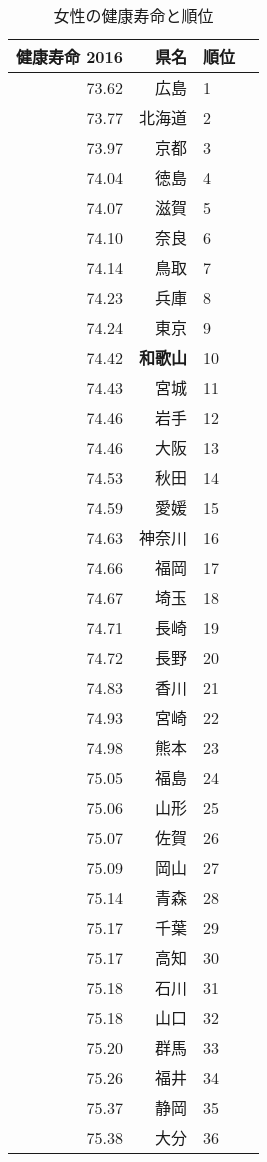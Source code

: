 \begin{table}[ht]
\centering
\scriptsize
\caption{女性の健康寿命と順位}
\begin{tabular}{rrlr}
  \hline
  健康寿命 2016 & 県名 & 順位 \\
  \hline
73.62 & 広島 &   1 \\
 73.77 & 北海道 &   2 \\
 73.97 & 京都 &   3 \\
 74.04 & 徳島 &   4 \\
 74.07 & 滋賀 &   5 \\
 74.10 & 奈良 &   6 \\
 74.14 & 鳥取 &   7 \\
 74.23 & 兵庫 &   8 \\
 74.24 & 東京 &   9 \\
 74.42 & \textbf{和歌山} &  10 \\
 74.43 & 宮城 &  11 \\
 74.46 & 岩手 &  12 \\
 74.46 & 大阪 &  13 \\
 74.53 & 秋田 &  14 \\
 74.59 & 愛媛 &  15 \\
 74.63 & 神奈川 &  16 \\
 74.66 & 福岡 &  17 \\
 74.67 & 埼玉 &  18 \\
 74.71 & 長崎 &  19 \\
 74.72 & 長野 &  20 \\
 74.83 & 香川 &  21 \\
 74.93 & 宮崎 &  22 \\
 74.98 & 熊本 &  23 \\
 75.05 & 福島 &  24 \\
 75.06 & 山形 &  25 \\
 75.07 & 佐賀 &  26 \\
 75.09 & 岡山 &  27 \\
 75.14 & 青森 &  28 \\
 75.17 & 千葉 &  29 \\
 75.17 & 高知 &  30 \\
 75.18 & 石川 &  31 \\
 75.18 & 山口 &  32 \\
 75.20 & 群馬 &  33 \\
 75.26 & 福井 &  34 \\
 75.37 & 静岡 &  35 \\
 75.38 & 大分 &  36 \\

\end{tabular}
\end{table}
